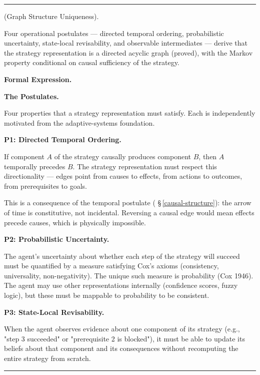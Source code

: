 \documentclass[11pt,oneside]{article}
\newcounter{claim}[section]
\renewcommand{\theclaim}{\thesection.\arabic{claim}}
\newenvironment{segment}[2]{%
  \refstepcounter{claim}%
  \bigskip\noindent\hrule\smallskip
  \noindent{\bfseries #1~\theclaim}\enskip(#2).\par\smallskip
  \noindent\ignorespaces
}{%
  \par\smallskip\noindent\hrule\bigskip
}
\newenvironment{derivation}[1][]{\begin{segment}{Derivation}{#1}}{\end{segment}}
\begin{document}
\begin{derivation}[Graph Structure Uniqueness]
\label{graph-structure-uniqueness}
Four operational postulates — directed temporal ordering, probabilistic uncertainty, state-local revisability, and observable intermediates — derive that the strategy representation is a directed acyclic graph (proved), with the Markov property conditional on causal sufficiency of the strategy.



\medskip\noindent\textbf{Formal Expression.}



\medskip\noindent\textbf{The Postulates.}


Four properties that a strategy representation must satisfy. Each is independently motivated from the adaptive-systems foundation.


\medskip\noindent\textbf{P1: Directed Temporal Ordering.}



If component $A$ of the strategy causally produces component $B$, then $A$ temporally precedes $B$. The strategy representation must respect this directionality — edges point from causes to effects, from actions to outcomes, from prerequisites to goals.

This is a consequence of the temporal postulate ( \S\,\ref{causal-structure}): the arrow of time is constitutive, not incidental. Reversing a causal edge would mean effects precede causes, which is physically impossible.


\medskip\noindent\textbf{P2: Probabilistic Uncertainty.}



The agent's uncertainty about whether each step of the strategy will succeed must be quantified by a measure satisfying Cox's axioms (consistency, universality, non-negativity). The unique such measure is probability (Cox 1946). The agent may use other representations internally (confidence scores, fuzzy logic), but these must be mappable to probability to be consistent.


\medskip\noindent\textbf{P3: State-Local Revisability.}



When the agent observes evidence about one component of its strategy (e.g., "step 3 succeeded" or "prerequisite 2 is blocked"), it must be able to update its beliefs about that component and its consequences without recomputing the entire strategy from scratch.


\end{derivation}
\end{document}
